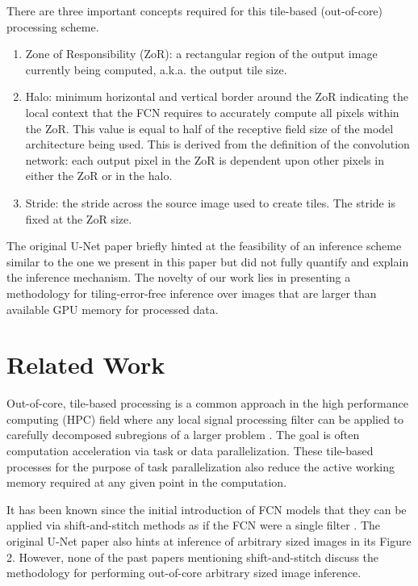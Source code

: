 \documentclass[10pt, indentfirst]{article}
\begin{document}
There are three important concepts required for this tile-based (out-of-core) processing scheme.
\begin{enumerate}
	\item Zone of Responsibility (ZoR): a rectangular region of the output image currently being computed, a.k.a. the output tile size.
	\item Halo: minimum horizontal and vertical border around the ZoR indicating the local context that the FCN requires to accurately compute all pixels within the ZoR.
	This value is equal to half of the receptive field size of the model architecture being used.
	This is derived from the definition of the convolution network: each output pixel in the ZoR is dependent upon other pixels in either the ZoR or in the halo.
	\item Stride: the stride across the source image used to create tiles.
	The stride is fixed at the ZoR size.
\end{enumerate}

The original U-Net paper \citep{Ronneberger2015a} briefly hinted at the feasibility of an inference scheme similar to the one we present in this paper but did not fully quantify and explain the inference mechanism.
The novelty of our work lies in presenting a methodology for tiling-error-free inference over images that are larger than available GPU memory for processed data.

\section{Related Work}
\label{related-work}

Out-of-core, tile-based processing is a common approach in the high performance computing (HPC) field where any local signal processing filter can be applied to carefully decomposed subregions of a larger problem \citep{Blattner2017}.
The goal is often computation acceleration via task or data parallelization.
These tile-based processes for the purpose of task parallelization also reduce the active working memory required at any given point in the computation.

It has been known since the initial introduction of FCN models that they can be applied via shift-and-stitch methods as if the FCN were a single filter \citep{Long2015,Sherrah2016}.
The original U-Net paper \citep{Ronneberger2015a} also hints at inference of arbitrary sized images in its Figure 2.
However, none of the past papers mentioning shift-and-stitch discuss the methodology for performing out-of-core arbitrary sized image inference.
\end{document}
